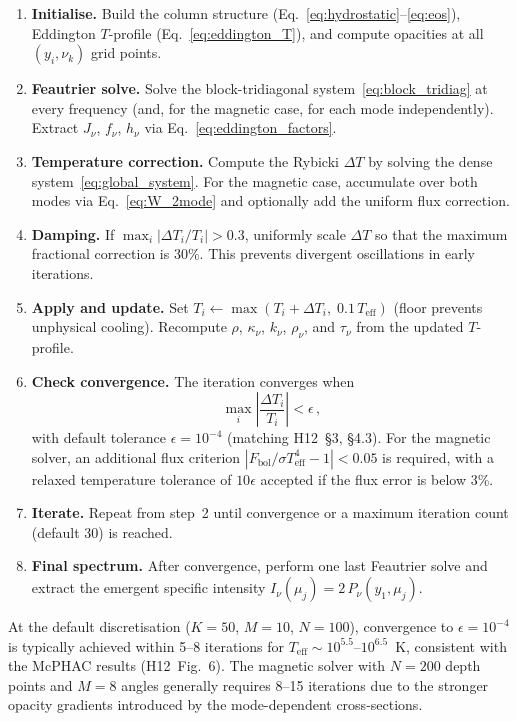 \begin{enumerate}
  \item \textbf{Initialise.} Build the column structure (Eq.~\ref{eq:hydrostatic}--\ref{eq:eos}), Eddington $T$-profile (Eq.~\ref{eq:eddington_T}), and compute opacities at all $(y_i, \nu_k)$ grid points.

  \item \textbf{Feautrier solve.} Solve the block-tridiagonal system~\eqref{eq:block_tridiag} at every frequency (and, for the magnetic case, for each mode independently). Extract $J_\nu$, $f_\nu$, $h_\nu$ via Eq.~\eqref{eq:eddington_factors}.

  \item \textbf{Temperature correction.} Compute the Rybicki $\Delta T$ by solving the dense system~\eqref{eq:global_system}. For the magnetic case, accumulate over both modes via Eq.~\eqref{eq:W_2mode} and optionally add the uniform flux correction.

  \item \textbf{Damping.} If $\max_i|\Delta T_i/T_i| > 0.3$, uniformly scale $\Delta T$ so that the maximum fractional correction is 30\%. This prevents divergent oscillations in early iterations.

  \item \textbf{Apply and update.} Set $T_i \leftarrow \max(T_i + \Delta T_i,\; 0.1\,T_\mathrm{eff})$ (floor prevents unphysical cooling). Recompute $\rho$, $\kappa_\nu$, $k_\nu$, $\rho_\nu$, and $\tau_\nu$ from the updated $T$-profile.

  \item \textbf{Check convergence.} The iteration converges when
  \begin{equation}
    \max_i\left|\frac{\Delta T_i}{T_i}\right| < \epsilon\,,
    \label{eq:convergence}
  \end{equation}
  with default tolerance $\epsilon = 10^{-4}$ (matching H12~\S3, \S4.3). For the magnetic solver, an additional flux criterion $|F_\mathrm{bol}/\sigma T_\mathrm{eff}^4 - 1| < 0.05$ is required, with a relaxed temperature tolerance of $10\epsilon$ accepted if the flux error is below 3\%.

  \item \textbf{Iterate.} Repeat from step~2 until convergence or a maximum iteration count (default 30) is reached.

  \item \textbf{Final spectrum.} After convergence, perform one last Feautrier solve and extract the emergent specific intensity $I_\nu(\mu_j) = 2\,P_\nu(y_1,\mu_j)$.
\end{enumerate}

At the default discretisation ($K=50$, $M=10$, $N=100$), convergence to $\epsilon=10^{-4}$ is typically achieved within 5--8 iterations for $T_\mathrm{eff} \sim 10^{5.5}$--$10^{6.5}$~K, consistent with the McPHAC results (H12~Fig.~6). The magnetic solver with $N=200$ depth points and $M=8$ angles generally requires 8--15 iterations due to the stronger opacity gradients introduced by the mode-dependent cross-sections.